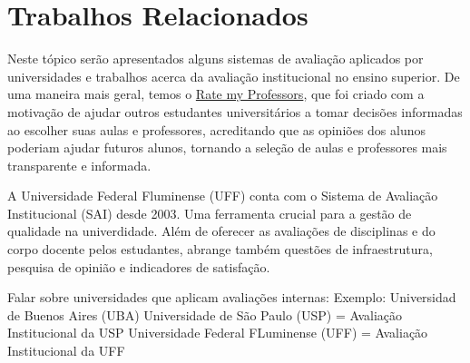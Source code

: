 \section{Trabalhos Relacionados}
Neste tópico serão apresentados alguns sistemas de avaliação aplicados por universidades e trabalhos acerca da avaliação institucional no ensino superior.
De uma maneira mais geral, temos o \href{https://www.ratemyprofessors.com/}{Rate my Professors}, que foi criado
com a motivação de ajudar outros estudantes universitários a tomar decisões informadas ao escolher suas aulas e professores, acreditando que as opiniões dos alunos poderiam ajudar futuros alunos, tornando a seleção de aulas e professores mais transparente e informada.

A Universidade Federal Fluminense (UFF) conta com o Sistema de Avaliação Institucional (SAI) desde 2003. Uma ferramenta
crucial para a gestão de qualidade na univerdidade. Além de oferecer as avaliações de disciplinas e do corpo docente pelos estudantes, abrange também questões de infraestrutura, pesquisa de opinião e indicadores de satisfação.

Falar sobre universidades que aplicam avaliações internas:
Exemplo: 
Universidad de Buenos Aires (UBA)
Universidade de São Paulo (USP) = Avaliação Institucional da USP
Universidade Federal FLuminense (UFF) = Avaliação Institucional da UFF
%


